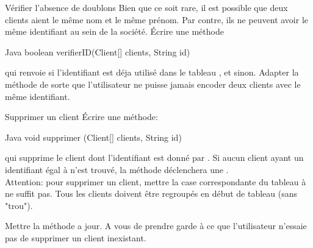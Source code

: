 \documentclass[a4paper,11pt]{style-esi/td}
\begin{document}
\begin{Exercice}{V\'erifier l'absence de doublons}
		Bien que ce soit rare, il est possible que deux clients aient le m\^eme nom et le m\^eme pr\'enom. Par contre, ils ne peuvent avoir le m\^eme identifiant au sein de la soci\'et\'e. \'Ecrire une m\'ethode
		
		\begin{Code}{Java}
		boolean verifierID(Client[] clients, String id)
		\end{Code}
		
qui renvoie  si l'identifiant  est d\'eja utilis\'e dans le tableau , et  sinon. Adapter la m\'ethode  de sorte que l'utilisateur ne puisse jamais encoder deux clients avec le m\^eme identifiant. 

\end{Exercice}
	
\begin{Exercice}{Supprimer un client}
		\'Ecrire une m\'ethode:
				
		\begin{Code}{Java}
		void supprimer (Client[] clients, String id)
		\end{Code}

qui supprime le client dont l'identifiant est donn\'e par . Si aucun client ayant un identifiant \'egal \`a  n'est trouv\'e, la m\'ethode d\'eclenchera une . \\

Attention: pour supprimer un client, mettre la case correspondante du tableau \`a  ne suffit pas. Tous les clients doivent \^etre regroup\'es en d\'ebut de tableau (sans "trou").


Mettre la m\'ethode  a jour. A vous de prendre garde \`a ce que l'utilisateur n'essaie pas de supprimer un client inexistant.
	
\end{Exercice}

	
	
\end{document}
